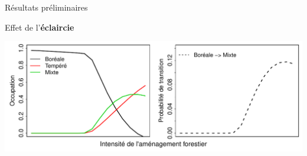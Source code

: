 \documentclass[11pt, compress, aspectratio=1610]{beamer}
\begin{document}
\begin{frame}{Résultats préliminaires}

Effet de l'\textbf{éclaircie}

\centering
 \includegraphics[scale=0.65]{figures/result1.pdf}\par

\end{frame}
\end{document}
